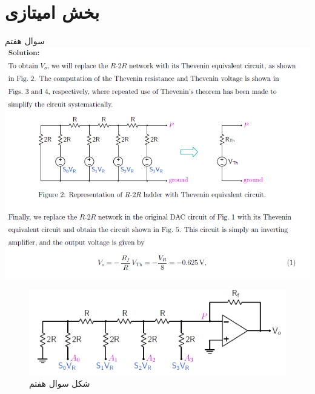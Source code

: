 \documentclass[12pt]{article}
\begin{document}
\section{بخش امیتازی}
    \begin{problem}{سوال هفتم}
    	\includegraphics[width=\linewidth]{Resources/4.png}
	
	
	\end{problem}   
	\begin{figure}
		\includegraphics[width=\linewidth]{Resources/1.png}
		\caption{شکل سوال هفتم}
	\end{figure}
\end{document}
